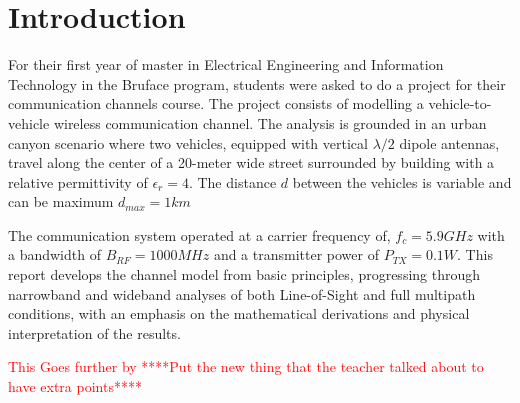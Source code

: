 \setcounter{secnumdepth}{-1}
\chapter{Introduction}
For their first year of master in Electrical Engineering and Information Technology in the Bruface program, students were asked to do a project for their communication channels course. The project consists of modelling a vehicle-to-vehicle wireless communication channel. The analysis is grounded in an urban canyon scenario where two vehicles, equipped with vertical $\lambda/2$ dipole antennas, travel along the center of a 20-meter wide street surrounded by building with a relative permittivity of $\epsilon_r=4$. The distance $d$ between the vehicles is variable and can be maximum $d_{max} = 1 km$

The communication system operated at a carrier frequency of, $f_c = 5.9 GHz$ with a bandwidth of $B_{RF} = 1000 MHz$ and a transmitter power of $P_{TX} = 0.1 W$. This report develops the channel model from basic principles, progressing through narrowband and wideband analyses of both Line-of-Sight and full multipath conditions, with an emphasis on the mathematical derivations and physical interpretation of the results.

\textcolor{red}{This Goes further by ****Put the new thing that the teacher talked about to have extra points****}